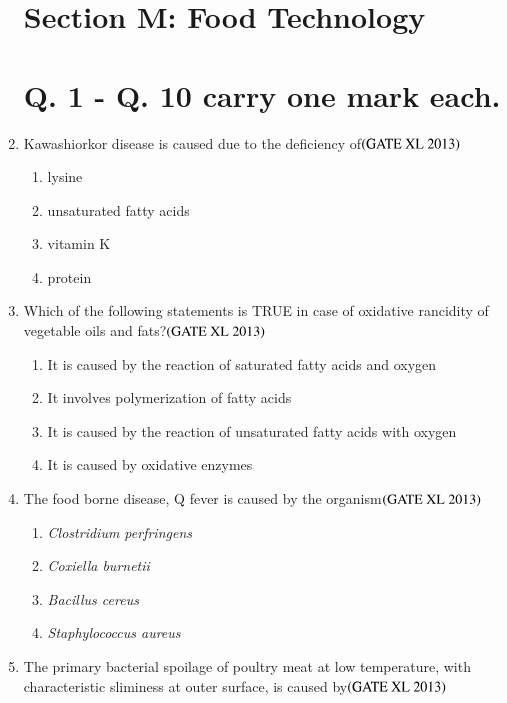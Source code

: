 \documentclass[journal]{IEEEtran}
\begin{document}
\begin{enumerate}
\clearpage
\section*{Section M: Food Technology}
\setcounter{enumi}{0}
\section*{Q. 1 - Q. 10 carry one mark each.}

\item Kawashiorkor disease is caused due to the deficiency of\hfill $\left(\text{GATE XL 2013}\right)$
\begin{enumerate}
\item lysine
\item unsaturated fatty acids
\item vitamin K
\item protein

\end{enumerate}

\item Which of the following statements is TRUE in case of oxidative rancidity of vegetable oils and fats?\hfill $\left(\text{GATE XL 2013}\right)$
\begin{enumerate}
    \item It is caused by the reaction of saturated fatty acids and oxygen
    \item It involves polymerization of fatty acids
    \item It is caused by the reaction of unsaturated fatty acids with oxygen
    \item It is caused by oxidative enzymes
\end{enumerate}

\item The food borne disease, Q fever is caused by the organism\hfill $\left(\text{GATE XL 2013}\right)$
\begin{enumerate}
    \item \textit{Clostridium perfringens}
    \item \textit{Coxiella burnetii}
    \item \textit{Bacillus cereus}
    \item \textit{Staphylococcus aureus}
\end{enumerate}

\item The primary bacterial spoilage of poultry meat at low temperature, with characteristic sliminess at outer surface, is caused by\hfill $\left(\text{GATE XL 2013}\right)$
\begin{enumerate}
\end{enumerate}


\end{enumerate}
\end{document}
